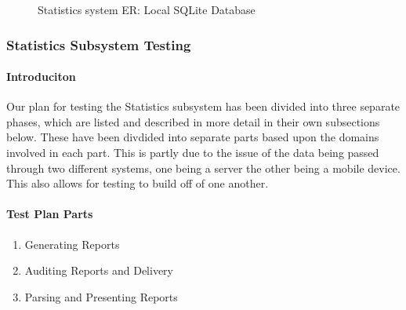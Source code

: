 \documentclass{article}
\begin{document}
\begin{figure}[H]
    \centering
    \begin{center}
    \end{center}
    \caption{Statistics system ER: Local SQLite Database}
    \label{fig:my_label}
\end{figure}

\subsubsection{Statistics Subsystem Testing}

\paragraph{Introduciton}
Our plan for testing the Statistics subsystem has been divided into three separate phases, which are listed and described in more detail in their own subsections below. These have been divdided into separate parts based upon the domains involved in each part. This is partly due to the issue of the data being passed through two different systems, one being a server the other being a mobile device. This also allows for testing to build off of one another.

\paragraph{Test Plan Parts}
\begin{enumerate}
\item Generating Reports
\item Auditing Reports and Delivery
\item Parsing and Presenting Reports
\end{enumerate}
\end{document}
